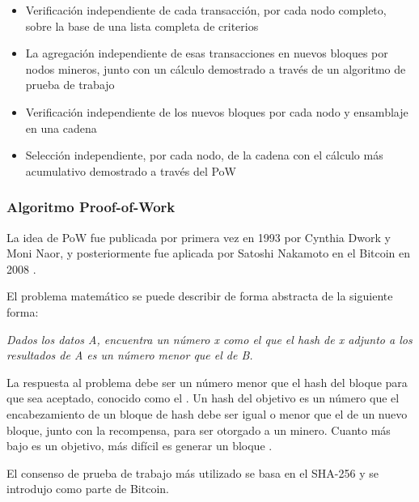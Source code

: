 \begin{itemize}
    \item Verificación independiente de cada transacción, por cada nodo completo, sobre la base de una lista completa 
    de criterios
    \item La agregación independiente de esas transacciones en nuevos bloques por nodos mineros, junto con un cálculo 
    demostrado a través de un algoritmo de prueba de trabajo
    \item Verificación independiente de los nuevos bloques por cada nodo y ensamblaje en una cadena
    \item Selección independiente, por cada nodo, de la cadena con el cálculo más acumulativo demostrado a través del 
    PoW
\end{itemize}

\subsubsection*{Algoritmo Proof-of-Work}

La idea de PoW fue publicada por primera vez en 1993 por Cynthia Dwork y Moni Naor, y posteriormente fue 
aplicada por Satoshi Nakamoto en el Bitcoin en 2008 \cite{proof-of-work}. 

\vspace{5mm}

\noindent El problema matemático se puede describir de forma abstracta de la siguiente forma: 

\vspace{5mm}

\noindent \textit{Dados los datos A, encuentra un número x como el que el hash de x adjunto a los resultados de A es un 
número menor que el de B.}

\vspace{5mm}

\noindent La respuesta al problema debe ser un número menor que el hash del bloque para que sea aceptado, conocido como 
el . Un hash del objetivo es un número que el encabezamiento de un bloque de hash debe ser igual 
o menor que el de un nuevo bloque, junto con la recompensa, para ser otorgado a un minero. Cuanto más bajo es un 
objetivo, más difícil es generar un bloque \cite{proof-of-work}.

\vspace{5mm}

\noindent El consenso de prueba de trabajo más utilizado se basa en el SHA-256 y se introdujo como parte de Bitcoin.

